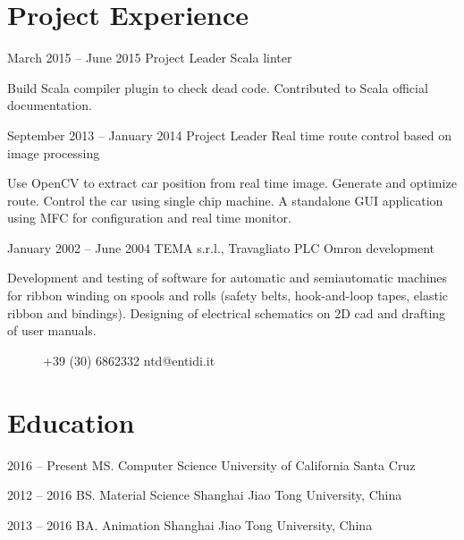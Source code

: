 \documentclass[fontsize=10pt]{tccv}
\begin{document}
\section{Project Experience}

\begin{eventlist}

\item{March 2015 -- June 2015}
     {Project Leader}
     {Scala linter}

Build Scala compiler plugin to check dead code.
Contributed to Scala official documentation.

\item{September 2013 -- January 2014}
     {Project Leader}
     {Real time route control based on image processing}

Use OpenCV to extract car position from real time image.
Generate and optimize route. Control the car using single
chip machine.
A standalone GUI application using MFC for configuration and
real time monitor.

\item{January 2002 -- June 2004}
     {TEMA s.r.l., Travagliato}
     {PLC Omron development}

Development and testing of software for automatic and semiautomatic
machines for ribbon winding on spools and rolls (safety belts,
hook-and-loop tapes, elastic ribbon and bindings). Designing of
electrical schematics on 2D cad and drafting of user manuals.

\end{eventlist}


\begin{figure}[t] %
      {+39 (30) 6862332}
      {ntd@entidi.it}
\end{figure}

\section{Education}

\begin{yearlist}

\item{2016 -- Present}
     {MS. Computer Science}
     {University of California Santa Cruz}

\item{2012 -- 2016}
     {BS. Material Science}
     {Shanghai Jiao Tong University, China}

\item{2013 -- 2016}
    {BA. Animation}
    {Shanghai Jiao Tong University, China}

\end{yearlist}
\end{document}
